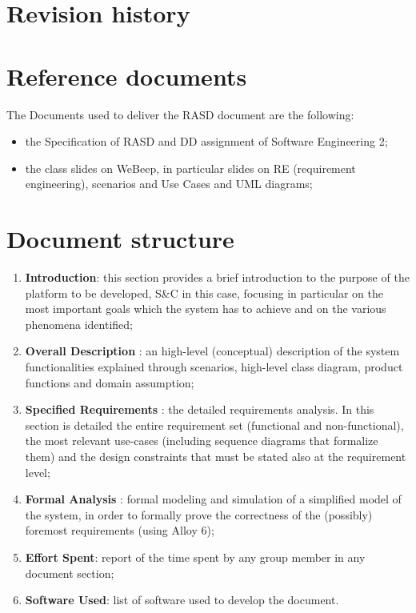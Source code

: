 	\section{Revision history}
		\begin{center}
		\end{center}
	\section{Reference documents}
		The Documents used to deliver the RASD document are the following:
		\begin{itemize}
			\item the Specification of RASD and DD assignment of Software Engineering 2;
			\item the class slides on WeBeep, in particular slides on RE (requirement engineering), scenarios and Use Cases and UML diagrams;
		\end{itemize}
	\section{Document structure}
		\begin{enumerate}
			\item \textbf{Introduction}: this section provides a brief introduction to the purpose of the platform to be developed, S\&C in this case, focusing in particular on the most important goals which the system has to achieve and on the various phenomena identified;
			\item \textbf{Overall Description} : an high-level (conceptual) description of the system functionalities explained through scenarios, high-level class diagram, product functions and domain assumption;
			\item \textbf{Specified Requirements} : the detailed requirements analysis. In this section is detailed the entire requirement set (functional and non-functional), the most relevant use-cases (including sequence diagrams that formalize them) and the design constraints that must be stated also at the requirement level;
			\item \textbf{Formal Analysis} : formal modeling and simulation of a simplified model of the system, in order to formally prove the correctness of the (possibly) foremost requirements (using Alloy 6);
			\item \textbf{Effort Spent}: report of the time spent by any group member in any document section;
			\item \textbf{Software Used}: list of software used to develop the document.
		\end{enumerate}
